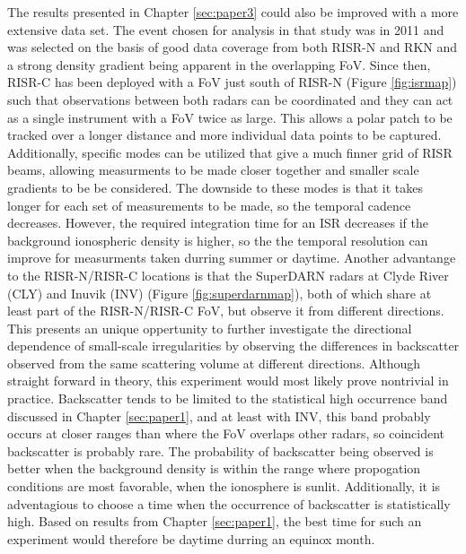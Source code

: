 The results presented in Chapter \ref{sec:paper3} could also be improved with a more extensive data set.  The event chosen for analysis in that study was in 2011 and was selected on the basis of good data coverage from both RISR-N and RKN and a strong density gradient being apparent in the overlapping FoV.  Since then, RISR-C has been deployed with a FoV just south of RISR-N (Figure \ref{fig:isrmap}) such that observations between both radars can be coordinated and they can act as a single instrument with a FoV twice as large.  This allows a polar patch to be tracked over a longer distance and more individual data points to be captured.  Additionally, specific modes can be utilized that give a much finner grid of RISR beams, allowing measurments to be made closer together and smaller scale gradients to be be considered.  The downside to these modes is that it takes longer for each set of measurements to be made, so the temporal cadence decreases.  However, the required integration time for an ISR decreases if the background ionospheric density is higher, so the the temporal resolution can improve for measurments taken durring summer or daytime.  Another advantange to the RISR-N/RISR-C locations is that the SuperDARN radars at Clyde River (CLY) and Inuvik (INV) (Figure \ref{fig:superdarnmap}), both of which share at least part of the RISR-N/RISR-C FoV, but observe it from different directions.  This presents an unique oppertunity to further investigate the directional dependence of small-scale irregularities by observing the differences in backscatter observed from the same scattering volume at different directions.  Although straight forward in theory, this experiment would most likely prove nontrivial in practice.  Backscatter tends to be limited to the statistical high occurrence band discussed in Chapter \ref{sec:paper1}, and at least with INV, this band probably occurs at closer ranges than where the FoV overlaps other radars, so coincident backscatter is probably rare.  The probability of backscatter being observed is better when the background density is within the range where propogation conditions are most favorable, when the ionosphere is sunlit.  Additionally, it is adventagious to choose a time when the occurrence of backscatter is statistically high.  Based on results from Chapter \ref{sec:paper1}, the best time for such an experiment would therefore be daytime durring an equinox month.



